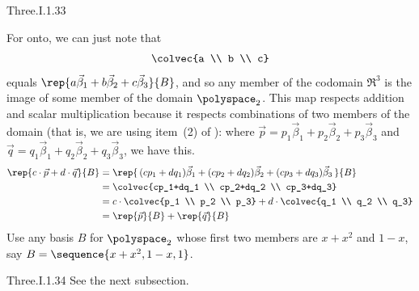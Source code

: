 \begin{ans}{Three.I.1.33}
\begin{exparts}
          For onto, we can just note that
          \begin{equation*}
            \colvec{a \\ b \\ c}
          \end{equation*}
          equals $\rep{a\vec{\beta}_1+b\vec{\beta}_2+c\vec{\beta}_3}{B}$, and
          so any member of the codomain $\Re^3$ is the image of some
          member of the domain $\polyspace_2$.
        \partsitem This map respects addition and scalar multiplication
           because it respects combinations of two members of the domain
           (that is, we are using item~(2) of
           ):
           where $\vec{p}=p_1\vec{\beta}_1+p_2\vec{\beta}_2+p_3\vec{\beta}_3$
           and $\vec{q}=q_1\vec{\beta}_1+q_2\vec{\beta}_2+q_3\vec{\beta}_3$,
           we have this.
           \begin{align*}
             \rep{c\cdot\vec{p}+d\cdot\vec{q}}{B}
             &=\rep{\,(cp_1+dq_1)\vec{\beta}_1+(cp_2+dq_2)\vec{\beta}_2
                  +(cp_3+dq_3)\vec{\beta}_3\,}{B}  \\
             &=\colvec{cp_1+dq_1 \\ cp_2+dq_2 \\ cp_3+dq_3}  \\
             &=c\cdot\colvec{p_1 \\ p_2 \\ p_3}
               +d\cdot\colvec{q_1 \\ q_2 \\ q_3}  \\
             &=\rep{\vec{p}}{B}+\rep{\vec{q}}{B}
           \end{align*}
        \partsitem Use any basis \( B \) for $\polyspace_2$
          whose first two members are \( x+x^2 \) and \( 1-x \),
          say \( B=\sequence{x+x^2,1-x,1} \).
      \end{exparts}
    
\end{ans}
\begin{ans}{Three.I.1.34}
      See the next subsection.
    
\end{ans}
